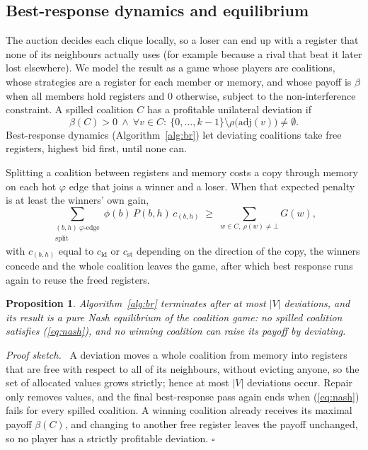 \documentclass[conference]{IEEEtran}
\newtheorem{proposition}{Proposition}
\newenvironment{proofsketch}{\noindent\textit{Proof sketch.}\ }{\hfill$\square$\par}
\newcommand{\cld}{c_{\mathrm{ld}}}
\newcommand{\cst}{c_{\mathrm{st}}}
\begin{document}
\subsection{Best-response dynamics and equilibrium}

The auction decides each clique locally, so a loser can end up with a
register that none of its neighbours actually uses (for example
because a rival that beat it later lost elsewhere). We model the result
as a game whose players are coalitions, whose strategies are a
register for each member or memory, and whose payoff is $\beta$ when
all members hold registers and $0$ otherwise, subject to the
non-interference constraint. A spilled coalition $C$ has a profitable
unilateral deviation if
\begin{equation}
\beta(C)>0\ \wedge\ \forall v\in C:\ \{0,\dots,k{-}1\}\setminus\rho\big(\mathrm{adj}(v)\big)\neq\emptyset .
\label{eq:nash}
\end{equation}
Best-response dynamics (Algorithm~\ref{alg:br}) let deviating
coalitions take free registers, highest bid first, until none can.

Splitting a coalition between registers and memory costs a copy through
memory on each hot $\varphi$ edge that joins a winner and a loser. When
that expected penalty is at least the winners' own gain,
\begin{equation}
\sum_{\substack{(b,h)\ \varphi\text{-edge}\\ \text{split}}}\phi(b)\,P(b,h)\,c_{(b,h)}
\;\ge\;\sum_{w\in C,\ \rho(w)\neq\bot}G(w),
\label{eq:repair}
\end{equation}
with $c_{(b,h)}$ equal to $\cld$ or $\cst$ depending on the direction of
the copy, the winners concede and the whole coalition leaves the
game, after which best response runs again to reuse the freed
registers.

\begin{proposition}
Algorithm~\ref{alg:br} terminates after at most $|V|$ deviations, and
its result is a pure Nash equilibrium of the coalition game: no spilled
coalition satisfies (\ref{eq:nash}), and no winning coalition can raise
its payoff by deviating.
\end{proposition}
\begin{proofsketch}
A deviation moves a whole coalition from memory into registers that
are free with respect to all of its neighbours, without evicting
anyone, so the set of allocated values grows strictly; hence at most
$|V|$ deviations occur. Repair only removes values, and the final
best-response pass again ends when (\ref{eq:nash}) fails for every
spilled coalition. A winning coalition already receives its maximal
payoff $\beta(C)$, and changing to another free register leaves the
payoff unchanged, so no player has a strictly profitable deviation.
\end{proofsketch}
\end{document}
